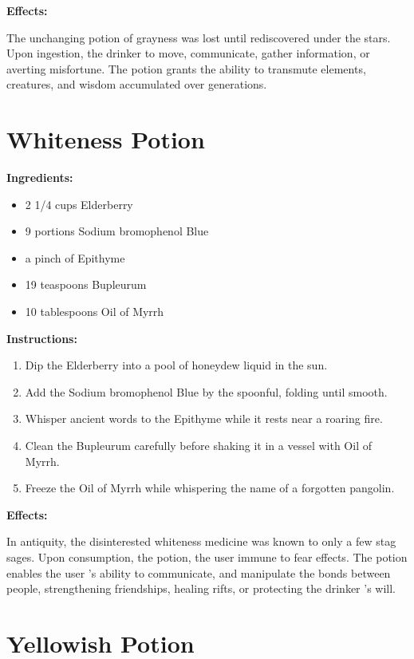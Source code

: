 \documentclass{article}
\begin{document}
\textbf{Effects:}

The unchanging potion of grayness was lost until rediscovered under the stars. Upon ingestion, the drinker to move, communicate, gather information, or averting misfortune. The potion grants the ability to transmute elements, creatures, and wisdom accumulated over generations.

\newpage
\section*{Whiteness Potion}

\textbf{Ingredients:}

\begin{itemize}
  \item 2 1/4 cups Elderberry
  \item 9 portions Sodium bromophenol Blue
  \item a pinch of Epithyme
  \item 19 teaspoons Bupleurum
  \item 10 tablespoons Oil of Myrrh
\end{itemize}

\textbf{Instructions:}

\begin{enumerate}
  \item Dip the Elderberry into a pool of honeydew liquid in the sun.
  \item Add the Sodium bromophenol Blue by the spoonful, folding until smooth.
  \item Whisper ancient words to the Epithyme while it rests near a roaring fire.
  \item Clean the Bupleurum carefully before shaking it in a vessel with Oil of Myrrh.
  \item Freeze the Oil of Myrrh while whispering the name of a forgotten pangolin.
\end{enumerate}

\textbf{Effects:}

In antiquity, the disinterested whiteness medicine was known to only a few stag sages. Upon consumption, the potion, the user immune to fear effects. The potion enables the user 's ability to communicate, and manipulate the bonds between people, strengthening friendships, healing rifts, or protecting the drinker 's will.

\newpage
\section*{Yellowish Potion}
\end{document}
